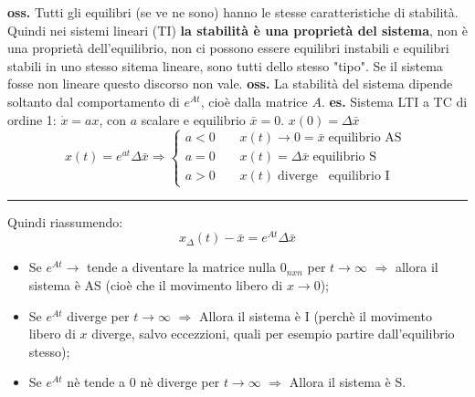 \newline
\textbf{oss.}  Tutti gli equilibri (se ve ne sono) hanno le stesse caratteristiche di stabilità.\newline
Quindi nei sistemi lineari (TI) \textbf{la stabilità è una proprietà del sistema}, non è una proprietà dell'equilibrio, non ci possono essere equilibri instabili e equilibri stabili in uno stesso sitema lineare, sono tutti dello stesso "tipo". Se il sistema fosse non lineare questo discorso non vale.\newline
\newline
\textbf{oss.} La stabilità del sistema dipende soltanto dal comportamento di $e^{At}$, cioè dalla matrice $A$.\newline
\newline
\textbf{es.}  Sistema LTI a TC di ordine 1:\newline
$\dot{x} = a x$, con $a$ scalare e equilibrio $\bar{x} = 0$.\newline
$x(0) = \Delta \bar{x}$\newline
\[
    x(t) = e^{at} \Delta \bar{x}\Rightarrow \begin{cases}
        a < 0 \;\;\;\; & x(t) \rightarrow  0 = \bar{x} \;\text{equilibrio AS}\;\\
        a = 0 \;\;\;\; & x(t) = \Delta \bar{x} \;\text{equilibrio S}\;\\
        a > 0 \;\;\;\; & x(t) \;\text{diverge}\;\;\;\text{equilibrio I}\;
    \end{cases}
\]
\rule{\textwidth}{0,4pt}\newline
\newline
Quindi riassumendo:
\[
    x_{\Delta}(t) - \bar{x} = e^{At}\Delta \bar{x}
\]
\begin{itemize}
    \item Se $e^{At} \rightarrow$ tende a diventare la matrice nulla $0_{nxn}$ per $t \rightarrow  \infty$ $\Longrightarrow$ allora il sistema è AS (cioè che il movimento libero di $x \rightarrow  0$);
    \item Se $e^{At}$ diverge per $t \rightarrow  \infty$ $\Longrightarrow$ Allora il sistema è I (perchè il movimento libero di $x$ diverge, salvo eccezzioni, quali per esempio partire dall'equilibrio stesso);
    \item Se $e^{At}$ nè tende a $0$ nè diverge per $t \rightarrow  \infty$ $\Longrightarrow$  Allora il sistema è S.
\end{itemize}
